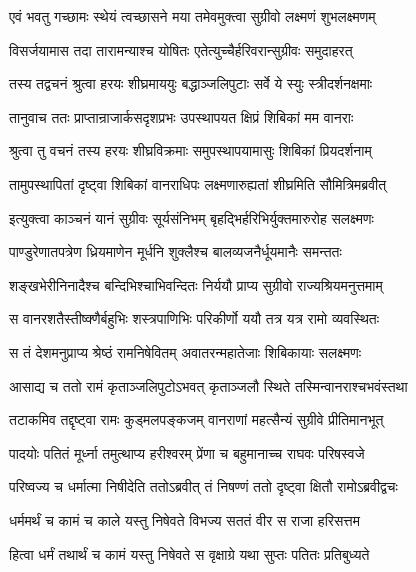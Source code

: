 \twolineshloka
{एवं भवतु गच्छामः स्थेयं त्वच्छासने मया}
{तमेवमुक्त्वा सुग्रीवो लक्ष्मणं शुभलक्ष्मणम्} %

\twolineshloka
{विसर्जयामास तदा तारामन्याश्च योषितः}
{एतेत्युच्चैर्हरिवरान्सुग्रीवः समुदाहरत्} %

\twolineshloka
{तस्य तद्वचनं श्रुत्वा हरयः शीघ्रमाययुः}
{बद्धाञ्जलिपुटाः सर्वे ये स्युः स्त्रीदर्शनक्षमाः} %

\twolineshloka
{तानुवाच ततः प्राप्तान्राजार्कसदृशप्रभः}
{उपस्थापयत क्षिप्रं शिबिकां मम वानराः} %

\twolineshloka
{श्रुत्वा तु वचनं तस्य हरयः शीघ्रविक्रमाः}
{समुपस्थापयामासुः शिबिकां प्रियदर्शनाम्} %

\twolineshloka
{तामुपस्थापितां दृष्ट्वा शिबिकां वानराधिपः}
{लक्ष्मणारुह्यतां शीघ्रमिति सौमित्रिमब्रवीत्} %

\twolineshloka
{इत्युक्त्वा काञ्चनं यानं सुग्रीवः सूर्यसंनिभम्}
{बृहद्भिर्हरिभिर्युक्तमारुरोह सलक्ष्मणः} %

\twolineshloka
{पाण्डुरेणातपत्रेण ध्रियमाणेन मूर्धनि}
{शुक्लैश्च बालव्यजनैर्धूयमानैः समन्ततः} %

\twolineshloka
{शङ्खभेरीनिनादैश्च बन्दिभिश्चाभिवन्दितः}
{निर्ययौ प्राप्य सुग्रीवो राज्यश्रियमनुत्तमाम्} %

\twolineshloka
{स वानरशतैस्तीष्क्णैर्बहुभिः शस्त्रपाणिभिः}
{परिकीर्णो ययौ तत्र यत्र रामो व्यवस्थितः} %

\twolineshloka
{स तं देशमनुप्राप्य श्रेष्ठं रामनिषेवितम्}
{अवातरन्महातेजाः शिबिकायाः सलक्ष्मणः} %

\twolineshloka
{आसाद्य च ततो रामं कृताञ्जलिपुटोऽभवत्}
{कृताञ्जलौ स्थिते तस्मिन्वानराश्चभवंस्तथा} %

\twolineshloka
{तटाकमिव तद्दृष्ट्वा रामः कुड्मलपङ्कजम्}
{वानराणां महत्सैन्यं सुग्रीवे प्रीतिमानभूत्} %

\twolineshloka
{पादयोः पतितं मूर्ध्ना तमुत्थाप्य हरीश्वरम्}
{प्रेंणा च बहुमानाच्च राघवः परिषस्वजे} %

\twolineshloka
{परिष्वज्य च धर्मात्मा निषीदेति ततोऽब्रवीत्}
{तं निषण्णं ततो दृष्ट्वा क्षितौ रामोऽब्रवीद्वचः} %

\twolineshloka
{धर्ममर्थं च कामं च काले यस्तु निषेवते}
{विभज्य सततं वीर स राजा हरिसत्तम} %

\twolineshloka
{हित्वा धर्मं तथार्थं च कामं यस्तु निषेवते}
{स वृक्षाग्रे यथा सुप्तः पतितः प्रतिबुध्यते} %

